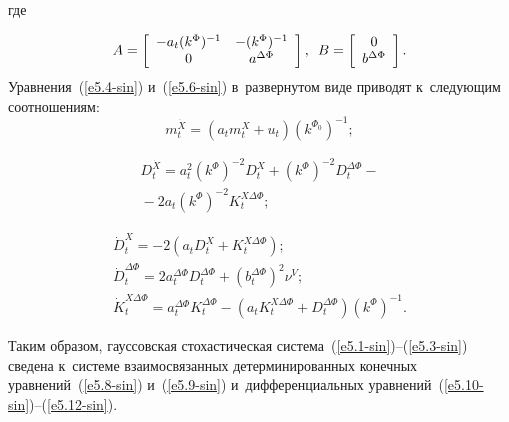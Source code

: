 \begin{multicols}{2}
        \vspace*{-2pt}
        
        \noindent
где

\vspace*{-2pt}

\noindent
  \begin{equation*}
    A=\left[ \begin{array}{cc}
    -a_t(k^\Phi)^{-1}&-(k^\Phi)^{-1}\\ 0& a^{\Delta \Phi}\\\end{array}\right],
    \enskip
  B=\left[ \begin{array}{c} 0\\ b^{\Delta\Phi}\\ \end{array}\right].
  \end{equation*}
Уравнения~(\ref{e5.4-sin}) и~(\ref{e5.6-sin}) в~развернутом виде приводят к~сле\-ду\-ющим соотношениям:
\begin{equation}
    m_t^{\dot X} = (a_t m_t^X +u_t) (k^{\Phi_0})^{-1};
    \label{e5.8-sin}
    \end{equation}
    
    \vspace*{-13pt}
    
    \noindent
\begin{multline}
D_t^{\dot X} = a_t^2\left(k^{\Phi}\right)^{-2} D_t^X +\left(k^{\Phi}\right)^{-2}D_t^{\Delta \Phi} -{}\\
{}-
    2a_t \left(k^{\Phi}\right)^{-2} K_t^{X\Delta\Phi};
    \label{e5.9-sin}
    \end{multline}
    
    \vspace*{-13pt}
    
    \noindent
    \begin{gather}
\dot D_t^{X} =-2\left( a_t D_t^X +K_t^{X\Delta \Phi}\right);
\label{e5.10-sin}
\\
\dot D_t^{\Delta\Phi} = 2a_t^{\Delta\Phi} D_t^{\Delta\Phi}+\left(b_t^{\Delta\Phi}\right)^2 \nu^V;
    \label{e5.11-sin}
   \\
\!\!\!\dot K_t^{X\Delta\Phi}\!=\!a_t^{\Delta\Phi}K_t^{\Delta\Phi}-\left(a_tK_t^{X\Delta\Phi}+
    D_t^{\Delta\Phi}\right)\left(k^\Phi\right)^{-1}\!\!.\!
    \label{e5.12-sin}
    \end{gather}

Таким образом, гауссовская стохастическая сис\-те\-ма~(\ref{e5.1-sin})--(\ref{e5.3-sin}) 
сведена к~сис\-те\-ме взаимосвязанных детерминированных конечных уравнений~(\ref{e5.8-sin}) и~(\ref{e5.9-sin}) 
и~дифференциальных уравнений~(\ref{e5.10-sin})--(\ref{e5.12-sin}).


\end{multicols}
